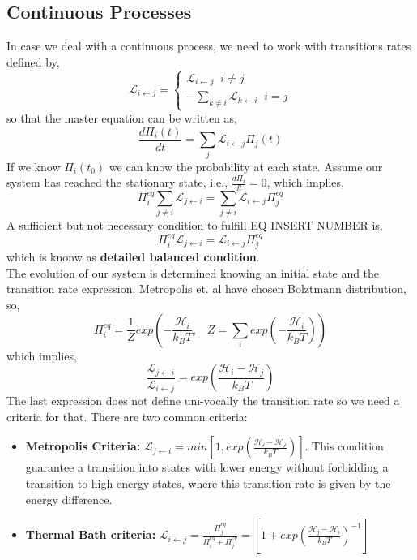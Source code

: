 \subsection{Continuous Processes}
In case we deal with a continuous process, we need to work with transitions rates defined by,
\begin{equation}
    \mathcal{L}_{i \leftarrow j} = 
    \begin{cases}
    \mathcal{L}_{i \leftarrow j} \;\; i\neq j\\
    -\sum_{k\neq i}\mathcal{L}_{k \leftarrow i} \;\; i = j
    \end{cases}
\end{equation}
so that the master equation can be written as,
\begin{equation}
    \frac{d\Pi_{i}(t)}{dt} = \sum_{j}\mathcal{L}_{i \leftarrow j} \Pi_{j}(t)
\end{equation}
If we know $\Pi_{i}(t_{0})$ we can know the probability at each state. Assume our system has reached the stationary state, i.e.,  $\frac{d\Pi_{i}}{dt} = 0$, which implies,
\begin{equation}
    \Pi_{i}^{eq} \sum_{j\neq i} \mathcal{L}_{j \leftarrow i} = \sum_{j \neq i}\mathcal{L}_{i \leftarrow j}\Pi_{j}^{eq} 
\end{equation}
A sufficient but not necessary condition to fulfill EQ INSERT NUMBER is,
\begin{equation}
    \Pi_{i}^{eq}\mathcal{L}_{j \leftarrow i} = \mathcal{L}_{i \leftarrow j}\Pi_{j}^{eq} 
\end{equation}
which is knonw as \textbf{detailed balanced condition}.\\
The evolution of our system is determined knowing an initial state and the transition rate expression. Metropolis et. al have chosen Bolztmann distribution, so,
\begin{equation}
    \Pi_{i}^{eq} = \frac{1}{Z}exp\left(- \frac{\mathcal{H}_{i}}{k_{B}T}, \;\;\; Z = \sum_{i}exp\left(-\frac{\mathcal{H}_{i}}{k_{B}T}\right)\right)
\end{equation}
which implies,
\begin{equation}
    \frac{\mathcal{L}_{j \leftarrow i}}{\mathcal{L}_{i \leftarrow j}} = exp\left(\frac{\mathcal{H}_{i} - \mathcal{H}_{j}}{k_{B}T}\right)
\end{equation}
The last expression does not define uni-vocally the transition rate so we need a criteria for that. There are two common criteria:
\begin{itemize}
    \item\textbf{ Metropolis Criteria:} $\mathcal{L}_{j \leftarrow i} = min \left[1,exp\left(\frac{\mathcal{H_{i}-\mathcal{H}_{j}}}{k_{B}T}\right)\right]$. This condition guarantee a transition into states with lower energy without forbidding a transition to high energy states, where this transition rate is given by the energy difference. 
    \item \textbf{Thermal Bath criteria:} $\mathcal{L}_{i \leftarrow j} = \frac{\Pi_{j}^{eq}}{\Pi_{i}^{eq} + \Pi_{j}^{eq}} = \left[1 + exp\left(\frac{\mathcal{H}_{j}- \mathcal{H}_{i}}{k_{B}T}\right)^{-1}\right]$ 
\end{itemize}

